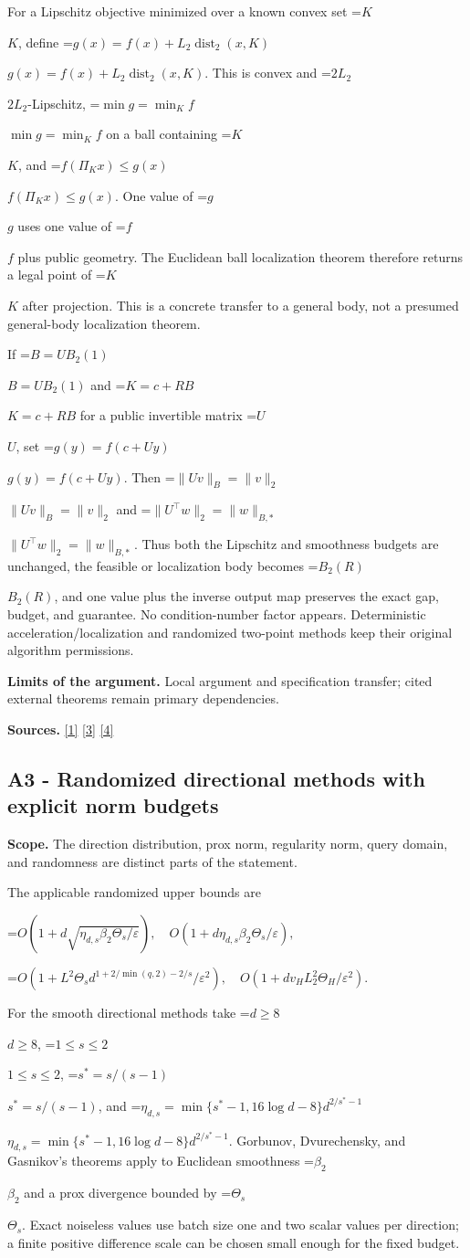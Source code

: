 \documentclass[10pt,a4paper]{article}
\newcommand{\AtlasMath}[1]{\par\begingroup\centering\setbox0=\hbox{$\displaystyle #1$}\ifdim\wd0>1.4\linewidth\typeout{ATLAS WIDE FORMULA: \the\wd0}\fi\ifdim\wd0>\linewidth\resizebox{\linewidth}{!}{\box0}\else\box0\fi\par\endgroup}
\newcommand{\AtlasInlineMath}[1]{\begingroup\setbox0=\hbox{$#1$}\ifdim\wd0>.4\linewidth\endgroup\AtlasMath{#1}\else\endgroup$#1$\fi}
\begin{document}
For a Lipschitz objective minimized over a known convex set \AtlasInlineMath{K}, define \AtlasInlineMath{g(x)=f(x)+L_2\operatorname{dist}_2(x,K)}. This is convex and \AtlasInlineMath{2L_2}-Lipschitz, \AtlasInlineMath{\min g=\min_K f} on a ball containing \AtlasInlineMath{K}, and \AtlasInlineMath{f(\Pi_Kx)\le g(x)}. One value of \AtlasInlineMath{g} uses one value of \AtlasInlineMath{f} plus public geometry. The Euclidean ball localization theorem therefore returns a legal point of \AtlasInlineMath{K} after projection. This is a concrete transfer to a general body, not a presumed general-body localization theorem.

If \AtlasInlineMath{B=UB_2(1)} and \AtlasInlineMath{K=c+RB} for a public invertible matrix \AtlasInlineMath{U}, set \AtlasInlineMath{g(y)=f(c+Uy)}. Then \AtlasInlineMath{\|Uv\|_B=\|v\|_2} and \AtlasInlineMath{\|U^\top w\|_2=\|w\|_{B,*}}. Thus both the Lipschitz and smoothness budgets are unchanged, the feasible or localization body becomes \AtlasInlineMath{B_2(R)}, and one value plus the inverse output map preserves the exact gap, budget, and guarantee. No condition-number factor appears. Deterministic acceleration/localization and randomized two-point methods keep their original algorithm permissions.

\textbf{Limits of the argument.} Local argument and specification transfer; cited external theorems remain primary dependencies.

\textbf{Sources.} \href{https://arxiv.org/html/2610.00345v1}{[1]} \href{https://arxiv.org/html/2607.16558v2}{[3]} \href{https://www.mathnet.ru/php/archive.phtml?jrnid=mzm&option_lang=eng&paperid=1697&wshow=paper}{[4]}

\subsection{A3 - Randomized directional methods with explicit norm budgets}
\textbf{Scope.} The direction distribution, prox norm, regularity norm, query domain, and randomness are distinct parts of the statement.

The applicable randomized upper bounds are

\AtlasMath{O(1+d\sqrt{\eta_{d,s}\beta_2\Theta_s/\varepsilon}),\quad O(1+d\eta_{d,s}\beta_2\Theta_s/\varepsilon),}


\AtlasMath{O(1+L^2\Theta_s d^{1+2/\min(q,2)-2/s}/\varepsilon^2),\quad O(1+dv_H L_2^2\Theta_H/\varepsilon^2).}


For the smooth directional methods take \AtlasInlineMath{d\ge8}, \AtlasInlineMath{1\le s\le2}, \AtlasInlineMath{s^*=s/(s-1)}, and \AtlasInlineMath{\eta_{d,s}=\min\{s^*-1,16\log d-8\}d^{2/s^*-1}}. Gorbunov, Dvurechensky, and Gasnikov's theorems apply to Euclidean smoothness \AtlasInlineMath{\beta_2} and a prox divergence bounded by \AtlasInlineMath{\Theta_s}. Exact noiseless values use batch size one and two scalar values per direction; a finite positive difference scale can be chosen small enough for the fixed budget.
\end{document}
